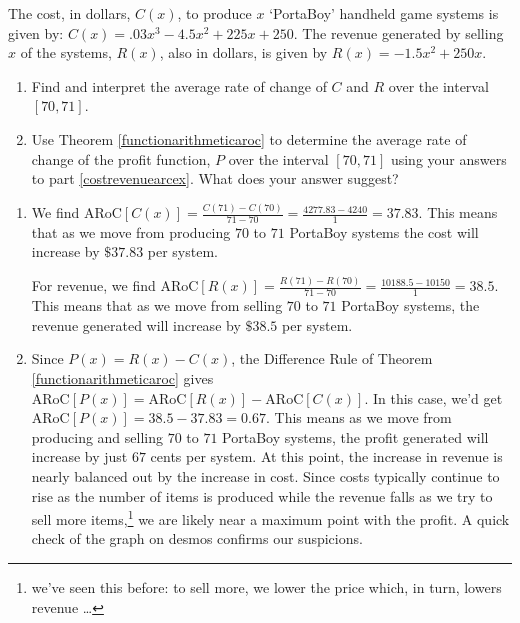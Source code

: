 \documentclass{ximera}
\begin{document}
\begin{example}\label{marginalsetupex}  The cost, in dollars,  $C(x)$, to produce $x$ `PortaBoy' handheld game systems is given by:  $C(x) = .03x^{3} - 4.5x^{2} + 225x + 250$.   The revenue generated by selling $x$  of the systems, $R(x)$, also in dollars, is given by $R(x) = -1.5x^2 + 250x$.

\begin{enumerate}

\item  \label{costrevenuearcex} Find and interpret the average rate of change of $C$ and $R$ over the interval $[70,71]$.

\item   Use Theorem \ref{functionarithmeticaroc} to determine the average rate of change of the profit function, $P$ over the interval $[70, 71]$ using your answers to part \ref{costrevenuearcex}.  What does your answer suggest?  
\end{enumerate}

\begin{explanation}

\begin{enumerate}

\item  We find $\text{ARoC}[C(x)] = \frac{C(71) - C(70)}{71-70} = \frac{4277.83 - 4240}{1} = 37.83$.  This means that as we move from producing $70$ to $71$ PortaBoy systems the cost will increase by $\$ 37.83$ per system.

For revenue, we find  $\text{ARoC}[R(x)] = \frac{R(71) - R(70)}{71-70} = \frac{10188.5 - 10150}{1} = 38.5$.  This means that as we move from selling $70$ to $71$ PortaBoy systems, the revenue generated will increase by $\$ 38.5$ per system.

\item  Since $P(x) = R(x) - C(x)$, the Difference Rule of Theorem \ref{functionarithmeticaroc} gives $\text{ARoC}[P(x)] = \text{ARoC}[R(x)] - \text{ARoC}[C(x)]$.  In this case, we'd get $\text{ARoC}[P(x)] =  38.5 - 37.83 = 0.67$.   This means as we move from producing and selling $70$ to $71$ PortaBoy systems, the profit generated will increase by just $67$ cents per system.  At this point, the increase in revenue is nearly balanced out by the increase in cost.  Since costs typically continue to rise as the number of items is produced while the revenue falls as we try to sell more items,\footnote{we've seen this before: to sell more, we lower the price which, in turn, lowers revenue \ldots} we are likely near a maximum point with the profit.  A quick check of the graph on desmos confirms our suspicions.

\begin{center}
\end{center}

\end{enumerate}
\end{explanation}

\end{example}
\end{document}
